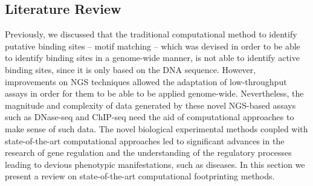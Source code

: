 \subsection{Literature Review}
\label{sec:literature.review}

Previously, we discussed that the traditional computational method to identify putative binding sites -- motif matching -- which was devised in order to be able to identify binding sites in a genome-wide manner, is not able to identify active binding sites, since it is only based on the DNA sequence. However, improvements on NGS techniques allowed the adaptation of low-throughput assays in order for them to be able to be applied genome-wide. Nevertheless, the magnitude and complexity of data generated by these novel NGS-based assays such as DNase-seq and ChIP-seq need the aid of computational approaches to make sense of such data. The novel biological experimental methods coupled with state-of-the-art computational approaches led to significant advances in the research of gene regulation and the understanding of the regulatory processes leading to devious phenotypic manifestations, such as diseases. In this section we present a review on state-of-the-art computational footprinting methods.

